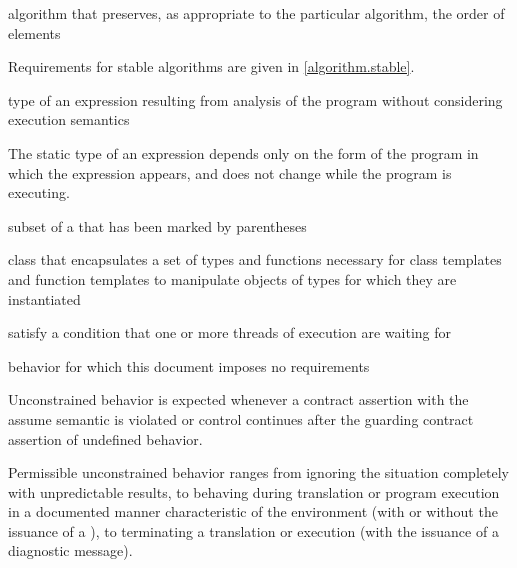 %
%
algorithm that preserves, as appropriate to the particular algorithm, the order
of elements

\begin{defnote}
Requirements for stable algorithms are given in \ref{algorithm.stable}.
\end{defnote}

%
type of an expression resulting from
analysis of the program without considering execution semantics

\begin{defnote}
The static type of an expression depends only on the form of the program in
which the expression appears, and does not change while the program is
executing.
\end{defnote}

%
subset of a  that has
been marked by parentheses

%
class that encapsulates a set of types and functions necessary for class templates and
function templates to manipulate objects of types for which they are instantiated

%
satisfy a condition that one or more  threads of execution are waiting for

%
behavior for which this document
imposes no requirements

\begin{defnote}
Unconstrained behavior is expected whenever
a contract assertion with the assume semantic
is violated
or control continues after the
guarding contract assertion
of undefined behavior.
\end{defnote}
\begin{defnote}
Permissible unconstrained behavior ranges
from ignoring the situation completely with unpredictable results, to
behaving during translation or program execution in a documented manner
characteristic of the environment (with or without the issuance of a
), to terminating a translation or execution (with the
issuance of a diagnostic message).
\end{defnote}


